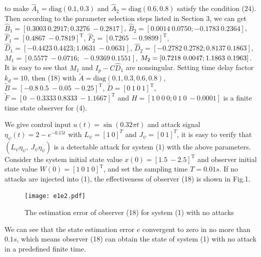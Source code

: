 \documentclass[english]{cccconf}
\theoremstyle{definition}
\begin{document}
to make $\hat{A}_1=\mathrm{diag}(0.1,0.3)$ and $\hat{A}_2=\mathrm{diag}(0.6,0.8)$ satisfy the condition (24). Then according to the parameter selection steps listed in Section 3, we can get $\hat{B}_1=[0.3003\  0.2917;0.3276\ -0.2817]$, $\hat{B}_2=[0.0014\ 0.0750;-0.1783 \  0.2364]$, $\hat{F}_1=[0.4867\ -0.7819]^\mathrm{T}$, $\hat{F}_2=[0.7265\ -0.9899]^\mathrm{T}$, $\hat{D}_1=[-0.4423\  0.4423;1.0631 \  -0.0631]$, $\hat{D}_2=[-0.2782    \ 0.2782;0.8137  \  0.1863]$, $M_1=[0.5577 \  -0.0716;\ -0.9369 \   0.1551]$, $M_2=[ 0.7218 \  0.0047;\-1.1863 \  0.1963]$. It is easy to see that $M_1$ and $I_p-C\hat{D}_1$ are nonsingular. Setting time delay factor $k_d=10$, then (18) with $\tilde{A}=\mathrm{diag}(0.1,0.3,0.6,0.8)$, $\tilde{B}=[-0.8\ 0.5\ -0.05\ -0.25]^\mathrm{T}$, $\tilde{D}=[0\ 1\ 0\ 1]^\mathrm{T}$, $\tilde{F}=[0\ -0.3333\ 0.8333\ -1.1667]^\mathrm{T}$ and
$H=[
1\ 0\  0 \  0;
0\  1\  0 \  -0.0001
]$
is a finite time state observer for (4). 

We give control input $u(t)=\sin(0.32\pi t)$ and attack signal $\eta_\psi(t)=2-e^{-0.15t}$ with $L_{\psi}=[1\ 0]^T$ and $J_{\psi}=[0\ 1]^T$, it is easy to verify that $(L_{\psi}\eta_\psi,\ J_{\psi}\eta_\psi)$ is a detectable attack for system (1) with the above parameters. Consider the system initial state value $x(0)=[1.5\  -2.5]^\mathrm{T}$ and observer initial state value $W(0)=[1\ 0\ 1 \ 0]^\mathrm{T}$, and set the sampling time $T=0.01s$. If no attacks are injected into (1), the effectiveness of observer (18) is shown in Fig.1.  
\begin{figure}[htbp]
\texttt{[image: e1e2.pdf]}
\caption{The estimation error of observer (18) for system (1) with  no attacks}
\end{figure}
We can see that the state estimation error $e$ convergent to zero in no more than $0.1s$, which means observer (18) can obtain the state of system (1) with no attack in a predefined finite time.
\end{document}
